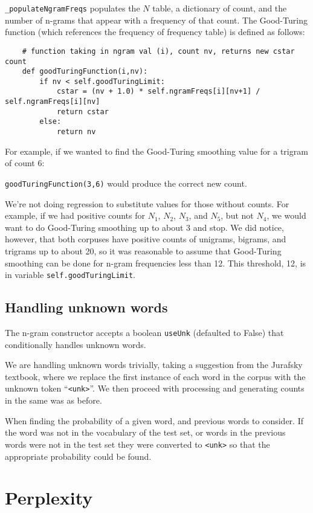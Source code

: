 \documentclass{article}
\begin{document}
\texttt{\_populateNgramFreqs} populates the $N$ table, a dictionary of count, and the number of n-grams that appear with a frequency of that count. The Good-Turing function (which references the frequency of frequency table) is defined as follows:

{\small\begin{verbatim}
    # function taking in ngram val (i), count nv, returns new cstar count
    def goodTuringFunction(i,nv):
        if nv < self.goodTuringLimit:
            cstar = (nv + 1.0) * self.ngramFreqs[i][nv+1] / self.ngramFreqs[i][nv]
            return cstar
        else:
            return nv
\end{verbatim}}

For example, if we wanted to find the Good-Turing smoothing value for a trigram of count 6:\par\texttt{goodTuringFunction(3,6)} would produce the correct new count.

We're not doing regression to substitute values for those without counts. For example, if we had positive counts for $N_1$, $N_2$, $N_3$, and $N_5$, but not $N_4$, we would want to do Good-Turing smoothing up to about 3 and stop. We did notice, however, that both corpuses have positive counts of unigrams, bigrams, and trigrams up to about 20, so it was reasonable to assume that Good-Turing smoothing can be done for n-gram frequencies less than 12. This threshold, 12, is in variable \texttt{self.goodTuringLimit}.

\subsection{Handling unknown words}
The n-gram constructor accepts a boolean \texttt{useUnk} (defaulted to False) that conditionally handles unknown words.\par
We are handling unknown words trivially, taking a suggestion from the Jurafsky textbook, where we replace the first instance of each word in the corpus with the unknown token ``\texttt{<unk>}''. We then proceed with processing and generating counts in the same was as before.

When finding the probability of a given word, and previous words to consider. If the word was not in the vocabulary of the test set, or words in the previous words were not in the test set they were converted to \texttt{<unk>} so that the appropriate probability could be found.

\section{Perplexity}
\end{document}
